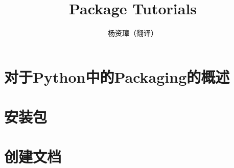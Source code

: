 \documentclass{ctexart}
\title{Package Tutorials}
\author{杨资璋（翻译）}
\begin{document}
\maketitle

\section{对于Python中的Packaging的概述}



\section{安装包}



\section{创建文档}


\end{document}
